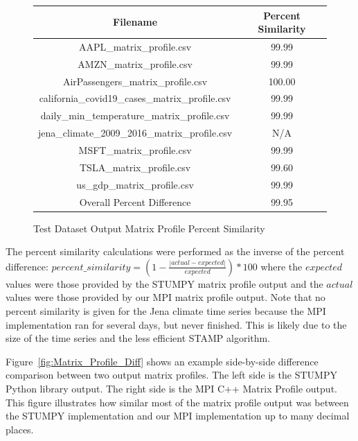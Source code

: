 \documentclass[conference]{IEEEtran}
\begin{document}
\begin{figure}
\begin{center}
\caption{Test Dataset Output Matrix Profile Percent Similarity}
\begin{tabular}{|c|c|}
\hline
\textbf{Filename} & \textbf{Percent Similarity} \\ \hline \hline
AAPL\_matrix\_profile.csv & 99.99 \\ \hline
AMZN\_matrix\_profile.csv & 99.99 \\ \hline
AirPassengers\_matrix\_profile.csv & 100.00 \\ \hline
california\_covid19\_cases\_matrix\_profile.csv & 99.99 \\ \hline
daily\_min\_temperature\_matrix\_profile.csv & 99.99 \\ \hline
jena\_climate\_2009\_2016\_matrix\_profile.csv & N/A \\ \hline
MSFT\_matrix\_profile.csv & 99.99 \\ \hline
TSLA\_matrix\_profile.csv & 99.60 \\ \hline
us\_gdp\_matrix\_profile.csv & 99.99 \\ \hline \hline
Overall Percent Difference & 99.95 \\ \hline
\hline
\end{tabular}
\label{fig:Matrix_Profile_Percent_Similarity}
\end{center}
\end{figure}

The percent similarity calculations were performed as the inverse of the percent difference: $percent\_similarity = \left(1 - \frac{|actual - expected|}{expected}\right) * 100$ where the $expected$ values were those provided by the STUMPY matrix profile output and the $actual$ values were those provided by our MPI matrix profile output. Note that no percent similarity is given for the Jena climate time series because the MPI implementation ran for several days, but never finished.  This is likely due to the size of the time series and the less efficient STAMP algorithm.

Figure~\ref{fig:Matrix_Profile_Diff} shows an example side-by-side difference comparison between two output matrix profiles.  The left side is the STUMPY Python library output.  The right side is the MPI C++ Matrix Profile output.  This figure illustrates how similar most of the matrix profile output was between the STUMPY implementation and our MPI implementation up to many decimal places.
\end{document}

